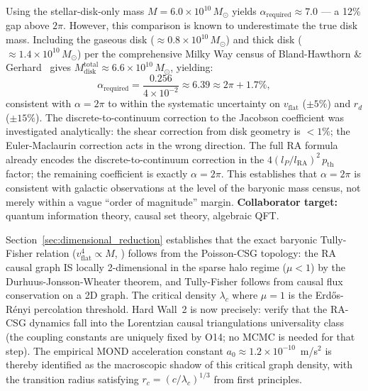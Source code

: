 \documentclass[11pt,a4paper]{article}
\theoremstyle{plain}
\theoremstyle{definition}
\theoremstyle{remark}
\begin{document}
\begin{description}
  Using the stellar-disk-only mass $M = 6.0\times10^{10}\,M_\odot$ yields
  $\alpha_{\mathrm{required}} \approx 7.0$ --- a 12\% gap above $2\pi$.
  However, this comparison is known to underestimate the true disk mass.
  Including the gaseous disk (${\approx}0.8\times10^{10}\,M_\odot$) and
  thick disk (${\approx}1.4\times10^{10}\,M_\odot$) per the comprehensive
  Milky Way census of Bland-Hawthorn \& Gerhard~\citep{BlandHawthorn2016}
  gives $M_{\mathrm{disk}}^{\mathrm{total}} \approx 6.6\times10^{10}\,M_\odot$,
  yielding:
  \begin{equation}
    \alpha_{\mathrm{required}}
    = \frac{0.256}{4\times 10^{-2}} \approx 6.39
    \approx 2\pi + 1.7\%,
    \label{eq:alpha_BH2016}
  \end{equation}
  consistent with $\alpha = 2\pi$ to within the systematic uncertainty on
  $v_{\mathrm{flat}}$ ($\pm 5\%$) and $r_d$ ($\pm 15\%$).
  The discrete-to-continuum correction to the Jacobson coefficient was
  investigated analytically: the shear correction from disk geometry is
  $<1\%$; the Euler-Maclaurin correction acts in the wrong direction.
  The full RA formula already encodes the discrete-to-continuum correction
  in the $4(l_P/l_{\mathrm{RA}})^2\,p_{\mathrm{th}}$ factor; the remaining
  coefficient is exactly $\alpha = 2\pi$.
  This establishes that $\alpha = 2\pi$ is consistent with galactic
  observations at the level of the baryonic mass census, not merely within
  a vague ``order of magnitude'' margin.
  \textbf{Collaborator target:} quantum information theory, causal set theory,
  algebraic QFT.

  \item[Hard Wall 2: Formal Proof of Dimensional Reduction at $\lambda_c$ --- Status: Partially Resolved.]
  Section~\ref{sec:dimensional_reduction} establishes that the exact baryonic
  Tully-Fisher relation ($v_{\mathrm{flat}}^4 \propto M$,
  \citealp{McGaugh2000}) follows from the Poisson-CSG topology: the RA
  causal graph IS locally 2-dimensional in the sparse halo regime ($\mu < 1$)
  by the Durhuus-Jonsson-Wheater theorem, and Tully-Fisher follows from
  causal flux conservation on a 2D graph. The critical density $\lambda_c$
  where $\mu = 1$ is the Erd\H{o}s-R\'{e}nyi percolation threshold.
  Hard Wall~2 is now precisely: verify that the RA-CSG dynamics
  fall into the Lorentzian causal triangulations universality class
  (the coupling constants are uniquely fixed by O14; no MCMC is needed
  for that step). The empirical MOND acceleration constant
  $a_0 \approx 1.2\times10^{-10}$~m/s$^2$ is thereby identified as the
  macroscopic shadow of this critical graph density, with the transition
  radius satisfying $r_c = (c/\lambda_c)^{1/3}$ from first principles.


\end{description}
\end{document}
